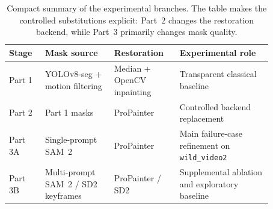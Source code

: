 \documentclass[10pt,twocolumn,letterpaper]{article}
\begin{document}
\begin{table}[t]
  \centering
  \small
  \setlength{\tabcolsep}{4pt}
  \begin{tabular}{@{}p{0.12\linewidth}p{0.23\linewidth}p{0.21\linewidth}p{0.31\linewidth}@{}}
    \toprule
    Stage & Mask source & Restoration & Experimental role \\
    \midrule
    Part 1 & YOLOv8-seg + motion filtering & Median + OpenCV inpainting & Transparent classical baseline \\
    Part 2 & Part 1 masks & ProPainter & Controlled backend replacement \\
    Part 3A & Single-prompt SAM~2 & ProPainter & Main failure-case refinement on \texttt{wild\_video2} \\
    Part 3B & Multi-prompt SAM~2 / SD2 keyframes & ProPainter / SD2 & Supplemental ablation and exploratory baseline \\
    \bottomrule
  \end{tabular}
  \caption{Compact summary of the experimental branches. The table makes the controlled substitutions explicit: Part~2 changes the restoration backend, while Part~3 primarily changes mask quality.}
  \label{tab:experiment-branches}
\end{table}
\end{document}

